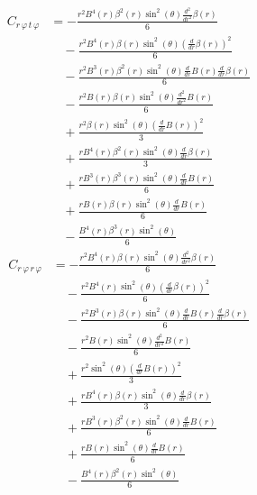 \documentclass[11pt,a4paper]{article}
\begin{document}
\begin{align*}
  C_{r\,\varphi\,t\,\varphi} &= - \frac{r^{2} B^{4}{\left(r \right)} \beta^{2}{\left(r \right)} \sin^{2}{\left(\theta \right)} \frac{d^{2}}{d r^{2}} \beta{\left(r \right)}}{6} \\
  &\quad - \frac{r^{2} B^{4}{\left(r \right)} \beta{\left(r \right)} \sin^{2}{\left(\theta \right)} \left(\frac{d}{d r} \beta{\left(r \right)}\right)^{2}}{6} \\
  &\quad - \frac{r^{2} B^{3}{\left(r \right)} \beta^{2}{\left(r \right)} \sin^{2}{\left(\theta \right)} \frac{d}{d r} B{\left(r \right)} \frac{d}{d r} \beta{\left(r \right)}}{6} \\
  &\quad - \frac{r^{2} B{\left(r \right)} \beta{\left(r \right)} \sin^{2}{\left(\theta \right)} \frac{d^{2}}{d r^{2}} B{\left(r \right)}}{6} \\
  &\quad + \frac{r^{2} \beta{\left(r \right)} \sin^{2}{\left(\theta \right)} \left(\frac{d}{d r} B{\left(r \right)}\right)^{2}}{3} \\
  &\quad + \frac{r B^{4}{\left(r \right)} \beta^{2}{\left(r \right)} \sin^{2}{\left(\theta \right)} \frac{d}{d r} \beta{\left(r \right)}}{3} \\
  &\quad + \frac{r B^{3}{\left(r \right)} \beta^{3}{\left(r \right)} \sin^{2}{\left(\theta \right)} \frac{d}{d r} B{\left(r \right)}}{6} \\
  &\quad + \frac{r B{\left(r \right)} \beta{\left(r \right)} \sin^{2}{\left(\theta \right)} \frac{d}{d r} B{\left(r \right)}}{6} \\
  &\quad - \frac{B^{4}{\left(r \right)} \beta^{3}{\left(r \right)} \sin^{2}{\left(\theta \right)}}{6}
\end{align*}
\begin{align*}
  C_{r\,\varphi\,r\,\varphi} &= - \frac{r^{2} B^{4}{\left(r \right)} \beta{\left(r \right)} \sin^{2}{\left(\theta \right)} \frac{d^{2}}{d r^{2}} \beta{\left(r \right)}}{6} \\
  &\quad - \frac{r^{2} B^{4}{\left(r \right)} \sin^{2}{\left(\theta \right)} \left(\frac{d}{d r} \beta{\left(r \right)}\right)^{2}}{6} \\
  &\quad - \frac{r^{2} B^{3}{\left(r \right)} \beta{\left(r \right)} \sin^{2}{\left(\theta \right)} \frac{d}{d r} B{\left(r \right)} \frac{d}{d r} \beta{\left(r \right)}}{6} \\
  &\quad - \frac{r^{2} B{\left(r \right)} \sin^{2}{\left(\theta \right)} \frac{d^{2}}{d r^{2}} B{\left(r \right)}}{6} \\
  &\quad + \frac{r^{2} \sin^{2}{\left(\theta \right)} \left(\frac{d}{d r} B{\left(r \right)}\right)^{2}}{3} \\
  &\quad + \frac{r B^{4}{\left(r \right)} \beta{\left(r \right)} \sin^{2}{\left(\theta \right)} \frac{d}{d r} \beta{\left(r \right)}}{3} \\
  &\quad + \frac{r B^{3}{\left(r \right)} \beta^{2}{\left(r \right)} \sin^{2}{\left(\theta \right)} \frac{d}{d r} B{\left(r \right)}}{6} \\
  &\quad + \frac{r B{\left(r \right)} \sin^{2}{\left(\theta \right)} \frac{d}{d r} B{\left(r \right)}}{6} \\
  &\quad - \frac{B^{4}{\left(r \right)} \beta^{2}{\left(r \right)} \sin^{2}{\left(\theta \right)}}{6}
\end{align*}
\end{document}

